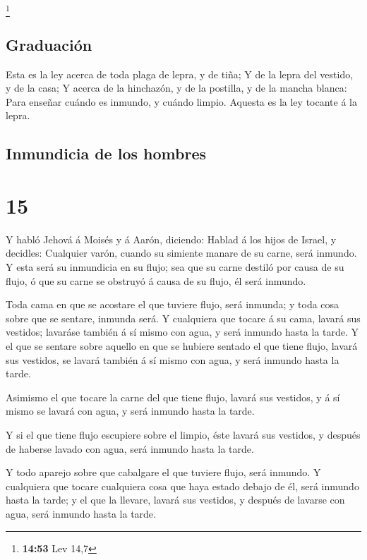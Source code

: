 \footnote{\textbf{14:53} Lev 14,7}

\hypertarget{graduaciuxf3n}{%
\subsection{Graduación}\label{graduaciuxf3n}}

 Esta es la ley acerca de toda plaga de lepra, y de tiña;
 Y de la lepra del vestido, y de la casa;  Y
acerca de la hinchazón, y de la postilla, y de la mancha blanca:
 Para enseñar cuándo es inmundo, y cuándo limpio. Aquesta
es la ley tocante á la lepra.

\hypertarget{inmundicia-de-los-hombres}{%
\subsection{Inmundicia de los hombres}\label{inmundicia-de-los-hombres}}

\hypertarget{section-14}{%
\section{15}\label{section-14}}

 Y habló Jehová á Moisés y á Aarón, diciendo: 
Hablad á los hijos de Israel, y decidles: Cualquier varón, cuando su
simiente manare de su carne, será inmundo.  Y esta será su
inmundicia en su flujo; sea que su carne destiló por causa de su flujo,
ó que su carne se obstruyó á causa de su flujo, él será inmundo.

 Toda cama en que se acostare el que tuviere flujo, será
inmunda; y toda cosa sobre que se sentare, inmunda será.  Y
cualquiera que tocare á su cama, lavará sus vestidos; lavaráse también á
sí mismo con agua, y será inmundo hasta la tarde.  Y el que
se sentare sobre aquello en que se hubiere sentado el que tiene flujo,
lavará sus vestidos, se lavará también á sí mismo con agua, y será
inmundo hasta la tarde.

 Asimismo el que tocare la carne del que tiene flujo, lavará
sus vestidos, y á sí mismo se lavará con agua, y será inmundo hasta la
tarde.

 Y si el que tiene flujo escupiere sobre el limpio, éste
lavará sus vestidos, y después de haberse lavado con agua, será inmundo
hasta la tarde.

 Y todo aparejo sobre que cabalgare el que tuviere flujo,
será inmundo.  Y cualquiera que tocare cualquiera cosa que
haya estado debajo de él, será inmundo hasta la tarde; y el que la
llevare, lavará sus vestidos, y después de lavarse con agua, será
inmundo hasta la tarde.

